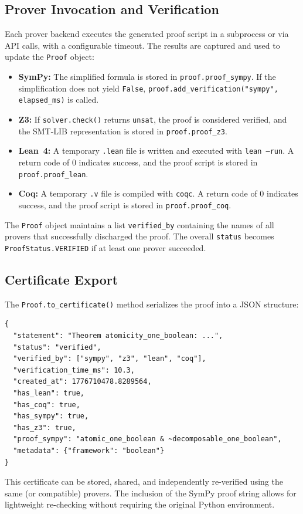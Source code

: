 \subsection{Prover Invocation and Verification}

Each prover backend executes the generated proof script in a subprocess or via API calls, with a configurable timeout. The results are captured and used to update the \texttt{Proof} object:
\begin{itemize}
    \item \textbf{SymPy:} The simplified formula is stored in \texttt{proof.proof\_sympy}. If the simplification does not yield \texttt{False}, \texttt{proof.add\_verification("sympy", elapsed\_ms)} is called.
    \item \textbf{Z3:} If \texttt{solver.check()} returns \texttt{unsat}, the proof is considered verified, and the SMT-LIB representation is stored in \texttt{proof.proof\_z3}.
    \item \textbf{Lean~4:} A temporary \texttt{.lean} file is written and executed with \texttt{lean --run}. A return code of $0$ indicates success, and the proof script is stored in \texttt{proof.proof\_lean}.
    \item \textbf{Coq:} A temporary \texttt{.v} file is compiled with \texttt{coqc}. A return code of $0$ indicates success, and the proof script is stored in \texttt{proof.proof\_coq}.
\end{itemize}

The \texttt{Proof} object maintains a list \texttt{verified\_by} containing the names of all provers that successfully discharged the proof. The overall \texttt{status} becomes \texttt{ProofStatus.VERIFIED} if at least one prover succeeded.

\subsection{Certificate Export}

The \texttt{Proof.to\_certificate()} method serializes the proof into a JSON structure:
\begin{lstlisting}[caption={Example certificate for Boolean atomicity of integer~1.}]
{
  "statement": "Theorem atomicity_one_boolean: ...",
  "status": "verified",
  "verified_by": ["sympy", "z3", "lean", "coq"],
  "verification_time_ms": 10.3,
  "created_at": 1776710478.8289564,
  "has_lean": true,
  "has_coq": true,
  "has_sympy": true,
  "has_z3": true,
  "proof_sympy": "atomic_one_boolean & ~decomposable_one_boolean",
  "metadata": {"framework": "boolean"}
}
\end{lstlisting}
This certificate can be stored, shared, and independently re-verified using the same (or compatible) provers. The inclusion of the SymPy proof string allows for lightweight re-checking without requiring the original Python environment.

